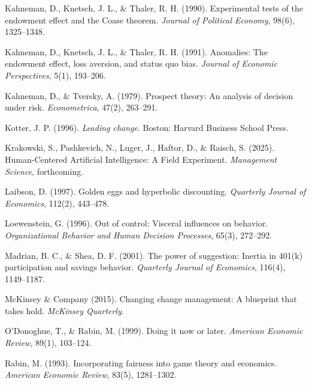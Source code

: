 \documentclass[11pt,a4paper]{article}
\begin{document}
\vspace{0.3cm}
Kahneman, D., Knetsch, J. L., \& Thaler, R. H. (1990). Experimental tests of the endowment effect and the Coase theorem. \textit{Journal of Political Economy}, 98(6), 1325--1348.

\vspace{0.3cm}
Kahneman, D., Knetsch, J. L., \& Thaler, R. H. (1991). Anomalies: The endowment effect, loss aversion, and status quo bias. \textit{Journal of Economic Perspectives}, 5(1), 193--206.

\vspace{0.3cm}
Kahneman, D., \& Tversky, A. (1979). Prospect theory: An analysis of decision under risk. \textit{Econometrica}, 47(2), 263--291.

\vspace{0.3cm}
Kotter, J. P. (1996). \textit{Leading change}. Boston: Harvard Business School Press.

\vspace{0.3cm}
Krakowski, S., Pashkevich, N., Luger, J., Haftor, D., \& Raisch, S. (2025). Human-Centered Artificial Intelligence: A Field Experiment. \textit{Management Science}, forthcoming.

\vspace{0.3cm}
Laibson, D. (1997). Golden eggs and hyperbolic discounting. \textit{Quarterly Journal of Economics}, 112(2), 443--478.

\vspace{0.3cm}
Loewenstein, G. (1996). Out of control: Visceral influences on behavior. \textit{Organizational Behavior and Human Decision Processes}, 65(3), 272--292.

\vspace{0.3cm}
Madrian, B. C., \& Shea, D. F. (2001). The power of suggestion: Inertia in 401(k) participation and savings behavior. \textit{Quarterly Journal of Economics}, 116(4), 1149--1187.

\vspace{0.3cm}
McKinsey \& Company (2015). Changing change management: A blueprint that takes hold. \textit{McKinsey Quarterly}.

\vspace{0.3cm}
O'Donoghue, T., \& Rabin, M. (1999). Doing it now or later. \textit{American Economic Review}, 89(1), 103--124.

\vspace{0.3cm}
Rabin, M. (1993). Incorporating fairness into game theory and economics. \textit{American Economic Review}, 83(5), 1281--1302.
\end{document}
